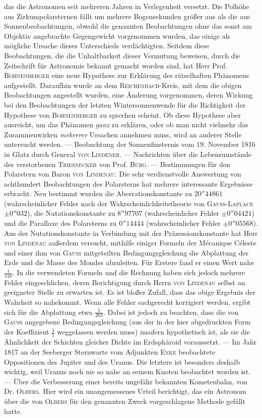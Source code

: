 das die Astronomen seit mehreren Jahren in Verlegenheit versetzt. Die Polhöhe aus Zirkumpolarsternen fällt um mehrere Bogensekunden größer aus als die aus Sonnenbeobachtungen, obwohl die genannten Beobachtungen ohne das sonst am Objektiv angebrachte Gegengewicht vorgenommen wurden, das einige als mögliche Ursache dieses Unterschieds verdächtigten. Seitdem diese Beobachtungen, die die Unhaltbarkeit dieser Vermutung beweisen, durch die Zeitschrift für Astronomie bekannt gemacht worden sind, hat Herr Prof. \textsc{Bohnenberger} eine neue Hypothese zur Erklärung des rätselhaften Phänomens aufgestellt. Daraufhin wurde an dem \textsc{Reichenbach}-Kreis, mit dem die obigen Beobachtungen angestellt wurden, eine Änderung vorgenommen, deren Wirkung bei den Beobachtungen der letzten Wintersonnenwende für die Richtigkeit der Hypothese von \textsc{Bohnenberger} zu sprechen scheint. Ob diese Hypothese aber ausreicht, um das Phänomen \emph{ganz} zu erklären, oder ob man nicht vielmehr das Zusammenwirken \emph{mehrerer} Ursachen annehmen muss, wird an anderer Stelle untersucht werden. --- Beobachtung der Sonnenfinsternis vom 19. November 1816 in Glatz durch General \textsc{von Lindener}. --- Nachrichten über die Lebensumstände des verstorbenen \textsc{Triesnecker} von Prof. \textsc{Bürg}. --- Bestimmungen für den Polarstern von Baron \textsc{von Lindenau}. Die sehr verdienstvolle Auswertung von achthundert Beobachtungen des Polarsterns hat mehrere interessante Ergebnisse erbracht. Neu bestimmt wurden die Aberrationskonstante zu $20''44861$ (wahrscheinlicher Fehler nach der Wahrscheinlichkeitstheorie von \textsc{Gauss-Laplace} $\pm0''032$), die Nutationskonstante zu $8''97707$ (wahrscheinlicher Fehler $\pm0''04421$) und die Parallaxe des Polarsterns zu $0''14444$ (wahrscheinlicher Fehler $\pm0''05568$). Aus der Nutationskonstante in Verbindung mit der Präzessionskonstante hat Herr \textsc{von Lindenau} außerdem versucht, mithilfe einiger Formeln der Mécanique Céleste und einer ihm von \textsc{Gauss} mitgeteilten Bedingungsgleichung die Abplattung der Erde und die Masse des Mondes abzuleiten. Für Erstere fand er einen Wert nahe $\tfrac{1}{316}$. In die verwendeten Formeln und die Rechnung haben sich jedoch mehrere Fehler eingeschlichen, deren Berichtigung durch Herrn \textsc{von Lindenau} selbst an geeigneter Stelle zu erwarten ist. Es ist bloßer Zufall, dass das obige Ergebnis der Wahrheit so nahekommt. Wenn alle Fehler sachgerecht korrigiert werden, ergibt sich für die Abplattung etwa $\tfrac{1}{203}$. Dabei ist jedoch zu beachten, dass die von \textsc{Gauss} angegebene Bedingungsgleichung (aus der in der hier abgedruckten Form der Koeffizient $\tfrac{3}{5}$ weggelassen werden muss) insofern hypothetisch ist, als sie die Ähnlichkeit der Schichten gleicher Dichte im Erdsphäroid voraussetzt. --- Im Jahr 1817 an der Seeberger Sternwarte vom Adjunkten \textsc{Enke} beobachtete Oppositionen des Jupiter und des Uranus. Die letztere ist besonders deshalb wichtig, weil Uranus noch nie so nahe an seinem Knoten beobachtet worden ist. --- Über die Verbesserung einer bereits ungefähr bekannten Kometenbahn, von Dr. \textsc{Olbers}. Hier wird ein unangemessenes Urteil berichtigt, das ein Astronom über die von \textsc{Olbers} für den genannten Zweck vorgeschlagene Methode gefällt hatte. 